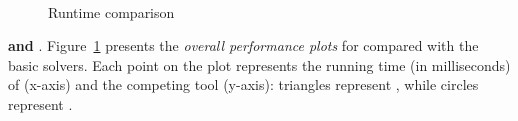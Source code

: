 \begin{figure}
~
\caption{Runtime comparison}
\label{fig:toolplot}
\end{figure}

\textbf{\ringenSync{} and \theringenCICI{}}. Figure~\ref{fig:toolplot} presents the \textit{overall performance plots} for \theringenCICI{}compared with the basic solvers. Each point on the plot represents the running time (in milliseconds) of \theringenCICI{} (x-axis) and the competing tool (y-axis): triangles represent \theringen{}, while circles represent \racer{}.
